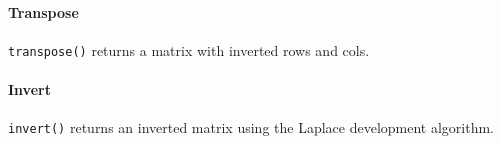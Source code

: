 \hypertarget{transpose}{%
\paragraph{Transpose}\label{transpose}}

\texttt{transpose()} returns a matrix with inverted rows and cols.

\begin{Shaded}
\begin{Highlighting}[]
\OperatorTok{()}
        \OperatorTok{\{}
            \OperatorTok{*}\OperatorTok{=}  \OperatorTok{[}\OperatorTok{*}\OperatorTok{];}
             \OperatorTok{=} \OperatorTok{;}
            \OperatorTok{(} \OperatorTok{=}\OperatorTok{;}\OperatorTok{\textless{}}\OperatorTok{;}\OperatorTok{++)}
            \OperatorTok{\{}
                \OperatorTok{(} \OperatorTok{=}\OperatorTok{;}\OperatorTok{\textless{}}\OperatorTok{;}\OperatorTok{++)}
                \OperatorTok{\{}
\OperatorTok{[}\OperatorTok{]} \OperatorTok{=} \OperatorTok{{-}\textgreater{}}\OperatorTok{[}\OperatorTok{][}\OperatorTok{];}
\OperatorTok{++;}
                \OperatorTok{\}}
            \OperatorTok{\}}
            \OperatorTok{(}\OperatorTok{,}\OperatorTok{,}\OperatorTok{);}
        \OperatorTok{\}}
\end{Highlighting}
\end{Shaded}

\hypertarget{invert}{%
\paragraph{Invert}\label{invert}}

\texttt{invert()} returns an inverted matrix using the Laplace
development algorithm.

